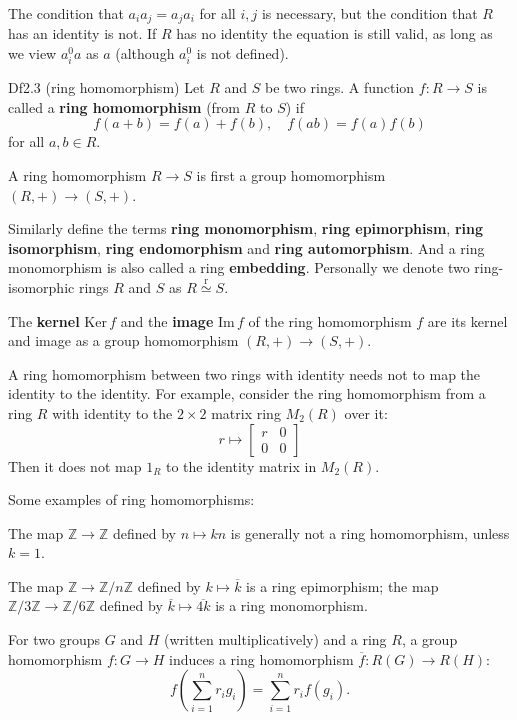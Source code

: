 \documentclass{article}
\newcommand{\Ker}{\text{Ker}\,}
\newcommand{\Ima}{\text{Im}\,}
\newcommand{\Riso}{\overset{\text{r}}{\simeq}}
\begin{document}
\begin{Rmk}{}
    \textcolor{Th}{The condition that $a_i a_j = a_j a_i$ for all $i, j$ is necessary, but the condition that $R$ has an identity is not. If $R$ has no identity the equation is still valid, as long as we view $a_i^0 a$ as $a$ (although $a_i^0$ is not defined).}
\end{Rmk}

\begin{Df}{Df2.3 (ring homomorphism)}
    Let $R$ and $S$ be two rings. A function $f: R \to S$ is called a \textbf{ring homomorphism} (from $R$ to $S$) if
    $$ f(a+b) = f(a) + f(b), \quad f(ab) = f(a)f(b) $$
    for all $a, b \in R$. 
\end{Df}

\begin{Rmk}{}
    \begin{compactenum}
        \item \textcolor{Th}{A ring homomorphism $R\to S$ is first a group homomorphism $(R, +) \to (S, +)$.}
        \item \textcolor{Df}{Similarly define the terms \textbf{ring monomorphism}, \textbf{ring epimorphism}, \textbf{ring isomorphism}, \textbf{ring endomorphism} and \textbf{ring automorphism}.} And \textcolor{Df}{a ring monomorphism is also called a ring \textbf{embedding}.} \textcolor{Df}{Personally we denote two ring-isomorphic rings $R$ and $S$ as $R \Riso S$.}
        \item \textcolor{Df}{The \textbf{kernel} $\Ker f$ and the \textbf{image} $\Ima f$ of the ring homomorphism $f$ are its kernel and image as a group homomorphism $(R, +) \to (S, +)$.}
        \item \textcolor{Th}{A ring homomorphism between two rings with identity needs not to map the identity to the identity.} For example, consider the ring homomorphism from a ring $R$ with identity to the $2\times 2$ matrix ring $M_2(R)$ over it:
        $$ r\mapsto \begin{bmatrix}
            r & 0 \\
            0 & 0 
        \end{bmatrix} $$
        Then it does not map $1_R$ to the identity matrix in $M_2(R)$. 
    \end{compactenum}
    Some examples of ring homomorphisms:
    \begin{compactenum}
        \item \textcolor{Th}{The map $\mathbb{Z} \to \mathbb{Z}$ defined by $n\mapsto kn$ is generally not a ring homomorphism, unless $k = 1$.}
        \item \textcolor{Th}{The map $\mathbb{Z} \to \mathbb{Z}/n\mathbb{Z}$ defined by $k\mapsto \overline{k}$ is a ring epimorphism; the map $\mathbb{Z}/3\mathbb{Z} \to \mathbb{Z}/6\mathbb{Z}$ defined by $\overline{k}\mapsto \overline{4k}$ is a ring monomorphism.}
        \item \textcolor{Th}{For two groups $G$ and $H$ (written multiplicatively) and a ring $R$, a group homomorphism $f: G \to H$ induces a ring homomorphism $\overline{f}: R(G) \to R(H)$:
        $$ f\left(\sum_{i=1}^n r_i g_i\right) = \sum_{i=1}^n r_i f(g_i). $$}
    \end{compactenum}
\end{Rmk}
\end{document}

